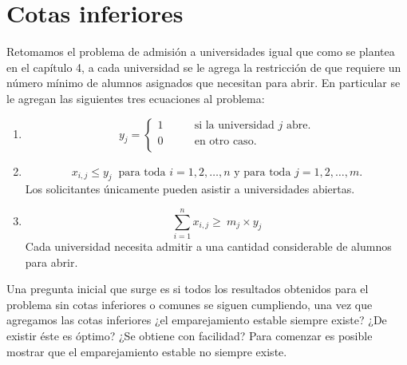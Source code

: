 \chapter{Cotas inferiores}

Retomamos el problema de admisión a universidades igual que como se plantea en el capítulo 4, a cada universidad se le agrega la restricción de que requiere un número mínimo de alumnos asignados que necesitan para abrir. En particular se le agregan las siguientes tres ecuaciones al problema:

\begin{enumerate}
\item \begin{equation} y_{j}= 
\begin{cases}
1 & \qquad \text{si la universidad $j$ abre.} \\
0 &\qquad\text{en otro caso.} \\ 
\end{cases} \end{equation} 
\item \begin{equation} \label{r6}
x_{i,j} \leq y_j \ \text{ para toda $i=1,2,\ldots,n$ y para toda $j=1,2,\ldots,m$.}
\end{equation}
Los solicitantes únicamente pueden asistir a universidades abiertas.
\item \begin{equation} \label{r4}
\sum_{i=1}^{n} x_{i,j} \geq\ m_j\times y_j 
\end{equation}
Cada universidad necesita admitir a una cantidad considerable de alumnos para abrir.
\end{enumerate}

Una pregunta inicial que surge es si todos los resultados obtenidos para el problema sin cotas inferiores o comunes se siguen cumpliendo, una vez que agregamos las cotas inferiores ¿el emparejamiento estable siempre existe? ¿De existir éste es óptimo? ¿Se obtiene con facilidad? Para comenzar es posible mostrar que el emparejamiento estable no siempre existe.

